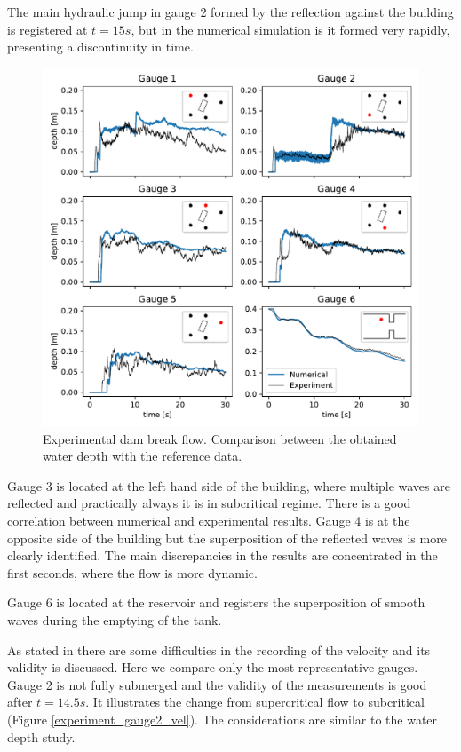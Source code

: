 The main hydraulic jump in gauge 2 formed by the reflection against the building is registered at $t=15s$, but in the numerical simulation is it formed very rapidly, presenting a discontinuity in time.

\begin{figure}
\centering
\includegraphics[width=\textwidth]{img/eulerian/exp/gauges.pdf}
\caption{Experimental dam break flow. Comparison between the obtained water depth with the reference data.}
\label{experiment_gauges}
\end{figure}

Gauge 3 is located at the left hand side of the building, where multiple waves are reflected and practically always it is in subcritical regime. There is a good correlation between numerical and experimental results. Gauge 4 is at the opposite side of the building but the superposition of the reflected waves is more clearly identified. The main discrepancies in the results are concentrated in the first seconds, where the flow is more dynamic.

Gauge 6 is located at the reservoir and registers the superposition of smooth waves during the emptying of the tank.

As stated in \cite{soares2007} there are some difficulties in the recording of the velocity and its validity is discussed. Here we compare only the most representative gauges. Gauge 2 is not fully submerged and the validity of the measurements is good after $t=14.5s$. It illustrates the change from supercritical flow to subcritical (Figure \ref{experiment_gauge2_vel}). The considerations are similar to the water depth study.


